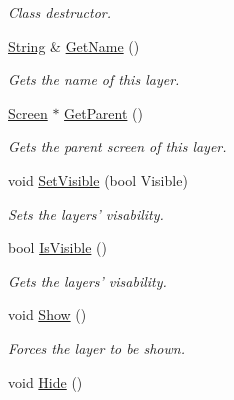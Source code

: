 \begin{DoxyCompactItemize}
\begin{DoxyCompactList}\small\item\em Class destructor. \item\end{DoxyCompactList}\item 
\hyperlink{namespacephys_aa03900411993de7fbfec4789bc1d392e}{String} \& \hyperlink{classphys_1_1UI_1_1Layer_a362edb47fdc9aa595dcaffc1ed617ae4}{GetName} ()
\begin{DoxyCompactList}\small\item\em Gets the name of this layer. \item\end{DoxyCompactList}\item 
\hyperlink{classphys_1_1UI_1_1Screen}{Screen} $\ast$ \hyperlink{classphys_1_1UI_1_1Layer_a484d10cf74177dea47d00ad7ddef8527}{GetParent} ()
\begin{DoxyCompactList}\small\item\em Gets the parent screen of this layer. \item\end{DoxyCompactList}\item 
void \hyperlink{classphys_1_1UI_1_1Layer_a421ed59dd2f50bed32a9e32c03327c39}{SetVisible} (bool Visible)
\begin{DoxyCompactList}\small\item\em Sets the layers' visability. \item\end{DoxyCompactList}\item 
bool \hyperlink{classphys_1_1UI_1_1Layer_a33f23515b8ac60adc2e99435574a2d9d}{IsVisible} ()
\begin{DoxyCompactList}\small\item\em Gets the layers' visability. \item\end{DoxyCompactList}\item 
\hypertarget{classphys_1_1UI_1_1Layer_ad8828d0c891ebbb9d7b9ca112793c725}{
void \hyperlink{classphys_1_1UI_1_1Layer_ad8828d0c891ebbb9d7b9ca112793c725}{Show} ()}
\label{dd/d5b/classphys_1_1UI_1_1Layer_ad8828d0c891ebbb9d7b9ca112793c725}

\begin{DoxyCompactList}\small\item\em Forces the layer to be shown. \item\end{DoxyCompactList}\item 
\hypertarget{classphys_1_1UI_1_1Layer_ad69fc503170e52b2248f76a87f57a2b8}{
void \hyperlink{classphys_1_1UI_1_1Layer_ad69fc503170e52b2248f76a87f57a2b8}{Hide} ()}
\label{dd/d5b/classphys_1_1UI_1_1Layer_ad69fc503170e52b2248f76a87f57a2b8}


\end{DoxyCompactItemize}

